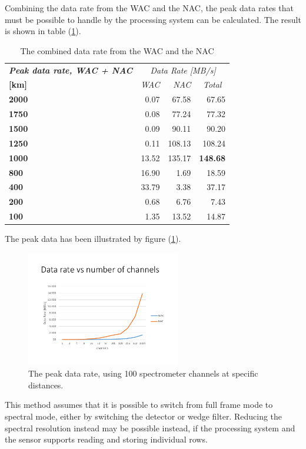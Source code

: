 Combining the data rate from the WAC and the NAC, the peak data rates that must be possible to handle by the processing system can be calculated. The result is shown in table (\ref{tab:peak_data_wac_nac}).
\begin{table}[h!]
  \centering
    \begin{tabular}{l|r|r|r|}
\textit{\textbf{Peak data rate, WAC + NAC}} & \multicolumn{3}{c|}{\textit{Data Rate [MB/s]}} \bigstrut[b]\\
\cline{1-1}\textbf{[km]} & \textit{WAC} & \textit{NAC} & \multicolumn{1}{c|}{\textit{Total}} \bigstrut\\
\hline
\textbf{2000} & 0.07  & \multicolumn{1}{r}{67.58} & 67.65 \bigstrut[t]\\
\textbf{1750} & 0.08  & \multicolumn{1}{r}{77.24} & 77.32 \\
\textbf{1500} & 0.09  & \multicolumn{1}{r}{90.11} & 90.20 \\
\textbf{1250} & 0.11  & \multicolumn{1}{r}{108.13} & 108.24 \\
\textbf{1000} & 13.52 & \multicolumn{1}{r}{135.17} & \textbf{148.68} \\
\textbf{800} & 16.90 & \multicolumn{1}{r}{1.69} & 18.59 \\
\textbf{400} & 33.79 & \multicolumn{1}{r}{3.38} & 37.17 \\
\textbf{200} & 0.68  & \multicolumn{1}{r}{6.76} & 7.43 \\
\textbf{100} & 1.35  & \multicolumn{1}{r}{13.52} & 14.87 \\
\end{tabular}%
    \caption{The combined data rate from the WAC and the NAC}
  \label{tab:peak_data_wac_nac}%
\end{table}%
The peak data has been illustrated by figure (\ref{fig:imaging_data_peak_throughput}).
\begin{figure}[h!]
\centering
\includegraphics[width=0.6\textwidth,page=2,trim=15mm 15mm 15mm 32mm,clip]{figures/Orbiter/Graphs_excel.pdf}
\caption{The peak data rate, using 100 spectrometer channels at specific distances.}
\label{fig:imaging_data_peak_throughput}
\end{figure}
This method assumes that it is possible to switch from full frame mode to spectral mode, either by switching the detector or wedge filter. Reducing the spectral resolution instead may be possible instead, if the processing system and the sensor supports reading and storing individual rows.

